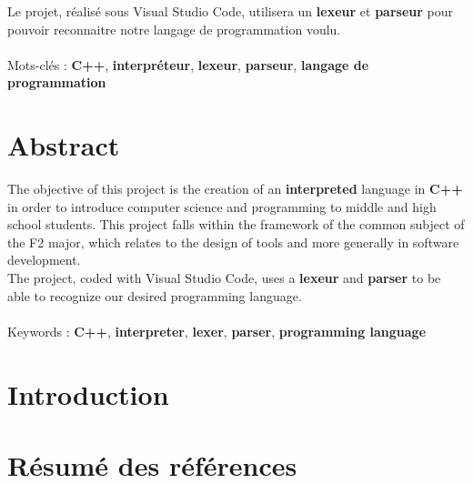 \documentclass[a4paper]{article}
\begin{document}
Le projet, réalisé sous Visual Studio Code, utilisera un \textbf{lexeur} et \textbf{parseur} pour pouvoir reconnaitre notre \textbf{}{langage de programmation} voulu.
\\~\\

\noindent
Mots-clés : \textbf{C++}, \textbf{interpréteur}, \textbf{lexeur}, \textbf{parseur},  \textbf{langage de programmation}
\\[2\baselineskip]

\section{Abstract}
The objective of this project is the creation of an \textbf{interpreted} language  in \textbf{C++} in order to introduce computer science and programming to middle and high school students. This project falls within the framework of the common subject of the F2 major, which relates to the design of tools and more generally in software development.\\

The project, coded with Visual Studio Code, uses a \textbf{lexeur} and \textbf{parser} to be able to recognize our desired \textbf{}{programming language}.
\\~\\

\noindent
Keywords : \textbf{C++}, \textbf{interpreter}, \textbf{lexer}, \textbf{parser},  \textbf{programming language}

\clearpage


\section{Introduction}






\section{Résumé des références}
\end{document}
